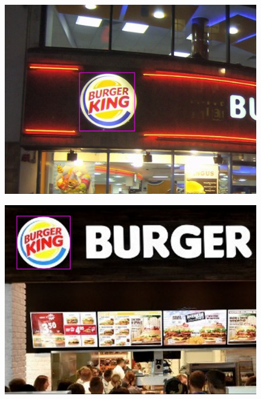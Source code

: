 \begin{figure}[h]
    \centering
    \includegraphics[width=\columnwidth]{figures/results/bk5.jpg}
    \label{fig:result5}
\end{figure}

\begin{figure}[h]
    \centering
    \includegraphics[width=\columnwidth]{figures/results/bk6.jpg}
    \label{fig:result6}
\end{figure}

